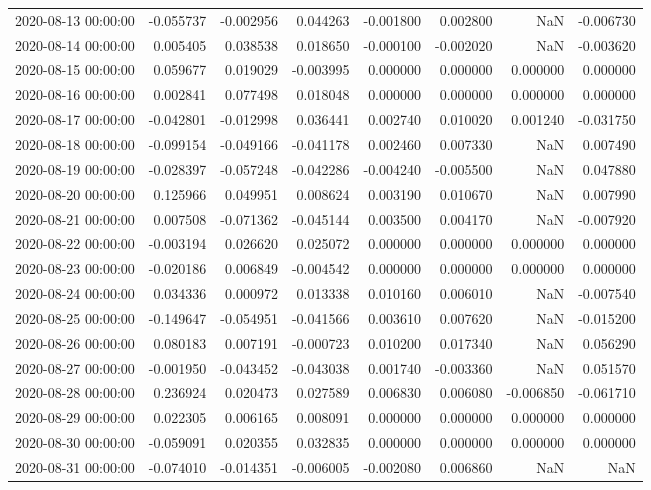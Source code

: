 \begin{tabular}{lrrrrrrr}
2020-08-13 00:00:00 & -0.055737 & -0.002956 & 0.044263 & -0.001800 & 0.002800 & NaN & -0.006730 \\
2020-08-14 00:00:00 & 0.005405 & 0.038538 & 0.018650 & -0.000100 & -0.002020 & NaN & -0.003620 \\
2020-08-15 00:00:00 & 0.059677 & 0.019029 & -0.003995 & 0.000000 & 0.000000 & 0.000000 & 0.000000 \\
2020-08-16 00:00:00 & 0.002841 & 0.077498 & 0.018048 & 0.000000 & 0.000000 & 0.000000 & 0.000000 \\
2020-08-17 00:00:00 & -0.042801 & -0.012998 & 0.036441 & 0.002740 & 0.010020 & 0.001240 & -0.031750 \\
2020-08-18 00:00:00 & -0.099154 & -0.049166 & -0.041178 & 0.002460 & 0.007330 & NaN & 0.007490 \\
2020-08-19 00:00:00 & -0.028397 & -0.057248 & -0.042286 & -0.004240 & -0.005500 & NaN & 0.047880 \\
2020-08-20 00:00:00 & 0.125966 & 0.049951 & 0.008624 & 0.003190 & 0.010670 & NaN & 0.007990 \\
2020-08-21 00:00:00 & 0.007508 & -0.071362 & -0.045144 & 0.003500 & 0.004170 & NaN & -0.007920 \\
2020-08-22 00:00:00 & -0.003194 & 0.026620 & 0.025072 & 0.000000 & 0.000000 & 0.000000 & 0.000000 \\
2020-08-23 00:00:00 & -0.020186 & 0.006849 & -0.004542 & 0.000000 & 0.000000 & 0.000000 & 0.000000 \\
2020-08-24 00:00:00 & 0.034336 & 0.000972 & 0.013338 & 0.010160 & 0.006010 & NaN & -0.007540 \\
2020-08-25 00:00:00 & -0.149647 & -0.054951 & -0.041566 & 0.003610 & 0.007620 & NaN & -0.015200 \\
2020-08-26 00:00:00 & 0.080183 & 0.007191 & -0.000723 & 0.010200 & 0.017340 & NaN & 0.056290 \\
2020-08-27 00:00:00 & -0.001950 & -0.043452 & -0.043038 & 0.001740 & -0.003360 & NaN & 0.051570 \\
2020-08-28 00:00:00 & 0.236924 & 0.020473 & 0.027589 & 0.006830 & 0.006080 & -0.006850 & -0.061710 \\
2020-08-29 00:00:00 & 0.022305 & 0.006165 & 0.008091 & 0.000000 & 0.000000 & 0.000000 & 0.000000 \\
2020-08-30 00:00:00 & -0.059091 & 0.020355 & 0.032835 & 0.000000 & 0.000000 & 0.000000 & 0.000000 \\
2020-08-31 00:00:00 & -0.074010 & -0.014351 & -0.006005 & -0.002080 & 0.006860 & NaN & NaN \\

\end{tabular}
